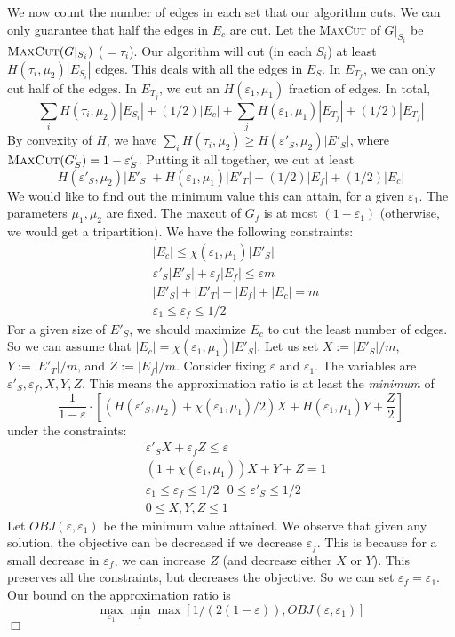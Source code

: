 \documentclass[11pt]{article}
\newenvironment{myproof}{\noindent {\sc Proof:}}{$\Box$}
\def\epsilon{\varepsilon}
\def\maxcut{\textsc{MaxCut}\xspace}
\begin{document}
\begin{myproof}
We now count the number of edges
in each set that our algorithm cuts. We can only
guarantee that half the edges in $E_c$ are cut. Let the
\maxcut of $G|_{S_i}$ be $\maxcut(G|_{S_i})$ ($= \tau_i$). Our algorithm will
cut (in each $S_i$) at least $H(\tau_i,\mu_2)|E_{S_i}|$ edges.
This deals with all the edges in $E_S$. In $E_{T_f}$, we can
only cut half of the edges. In $E_{T_j}$, we cut an $H(\epsilon_1,\mu_1)$
fraction of edges. In total,
$$ \sum_i H(\tau_i,\mu_2)|E_{S_i}| + (1/2)|E_c|
+ \sum_j H(\epsilon_1,\mu_1)|E_{T_j}| + (1/2)|E_{T_f}|$$
By convexity of $H$, we have
$\sum_i H(\tau_i,\mu_2) \geq H(\epsilon'_S,\mu_2) |E'_S|$,
where $\maxcut(G'_S) = 1 - \epsilon'_S$. Putting it all together, we cut
at least
$$ H(\epsilon'_S,\mu_2)|E'_S| + H(\epsilon_1,\mu_1) |E'_T|
+ (1/2)|E_f| +  (1/2)|E_c| $$
We would like to find out the minimum value this can attain, for a given
$\epsilon_1$. The parameters $\mu_1, \mu_2$ are fixed.
The maxcut of $G_f$ is at most $(1-\epsilon_1)$ (otherwise, we would
get a tripartition). We have the
following constraints:
\begin{eqnarray*}
& |E_c| \leq \chi(\epsilon_1,\mu_1)|E'_S| \\
& \epsilon'_S|E'_S| + \epsilon_f|E_f| \leq \epsilon m \\
& |E'_S| + |E'_T| + |E_f| + |E_c| = m \\
& \epsilon_1 \leq \epsilon_f \leq 1/2
\end{eqnarray*}
For a given size of $E'_S$, we should maximize $E_c$ to cut the least
number of edges. So we can assume that $|E_c| = \chi(\epsilon_1,\mu_1)|E'_S|$.
Let us set $X := |E'_S|/m$, $Y := |E'_T|/m$, and $Z := |E_f|/m$.
Consider fixing $\epsilon$ and $\epsilon_1$. The variables are $\epsilon'_S, \epsilon_f, X, Y, Z$.
This means the approximation ratio is at least
the \emph{minimum} of
$$ \frac{1}{1-\epsilon}\cdot \left[(H(\epsilon'_S,\mu_2) + \chi(\epsilon_1,\mu_1)/2)X
+ H(\epsilon_1,\mu_1) Y + \frac{Z}{2}\right] $$
under the constraints:
\begin{eqnarray*}
& \epsilon'_S X + \epsilon_f Z \leq \epsilon \\
& (1+\chi(\epsilon_1,\mu_1))X + Y + Z = 1 \\
& \epsilon_1 \leq \epsilon_f \leq 1/2 \ \ \ 0 \leq \epsilon'_S \leq 1/2\\
& 0 \leq X, Y, Z \leq 1
\end{eqnarray*}
Let $OBJ(\epsilon,\epsilon_1)$ be the minimum value attained.
We observe that given any solution, the objective can
be decreased if we decrease $\epsilon_f$. This is because for
a small decrease in $\epsilon_f$, we can increase $Z$ (and decrease either $X$ or $Y$).
This preserves all the constraints, but decreases the objective.
So we can set $\epsilon_f = \epsilon_1$.
Our bound on the approximation ratio is
$$ \max_{\epsilon_1} \min_{\epsilon} \max[1/(2(1-\epsilon)), OBJ(\epsilon,\epsilon_1)] $$
\end{myproof}
\end{document}
